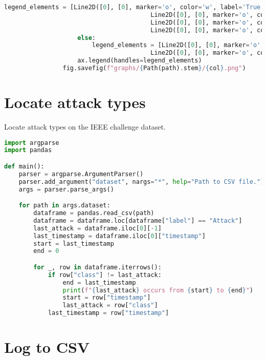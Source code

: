 \begin{lstlisting}[language=Python]
                        legend_elements = [Line2D([0], [0], marker='o', color='w', label='True positive', markerfacecolor='g', markersize=15),
                                        Line2D([0], [0], marker='o', color='w', label='True negative', markerfacecolor='b', markersize=15),
                                        Line2D([0], [0], marker='o', color='w', label='False positive', markerfacecolor='y', markersize=15),
                                        Line2D([0], [0], marker='o', color='w', label='False negative', markerfacecolor='r', markersize=15)]
                    else:
                        legend_elements = [Line2D([0], [0], marker='o', color='w', label='Alert', markerfacecolor='g', markersize=15),
                                        Line2D([0], [0], marker='o', color='w', label='No alert', markerfacecolor='b', markersize=15)]
                    ax.legend(handles=legend_elements)
                fig.savefig(f"graphs/{Path(path).stem}/{col}.png")
\end{lstlisting}

\section{Locate attack types}

Locate attack types on the IEEE challenge dataset.

\begin{lstlisting}[language=Python]
import argparse
import pandas

def main():
    parser = argparse.ArgumentParser()
    parser.add_argument("dataset", nargs="*", help="Path to CSV file.")
    args = parser.parse_args()

    for path in args.dataset:
        dataframe = pandas.read_csv(path)
        dataframe = dataframe.loc[dataframe["label"] == "Attack"]
        last_attack = dataframe.iloc[0][-1]
        last_timestamp = dataframe.iloc[0]["timestamp"]
        start = last_timestamp
        end = 0

        for _, row in dataframe.iterrows():
            if row["class"] != last_attack:
                end = last_timestamp
                print(f"{last_attack} occurs from {start} to {end}")
                start = row["timestamp"]
                last_attack = row["class"]
            last_timestamp = row["timestamp"]
\end{lstlisting}

\section{Log to CSV}

